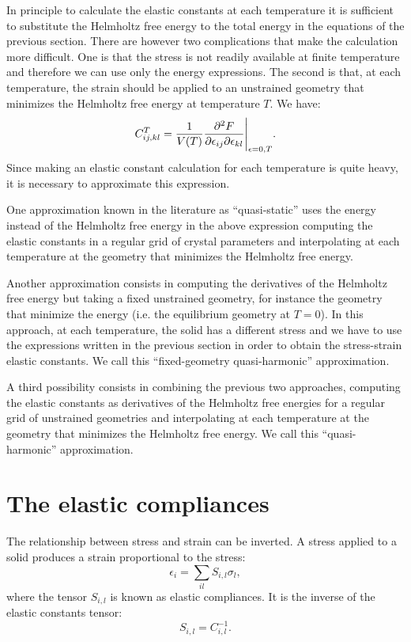 \documentclass[12pt,a4paper,twoside]{report}
\begin{document}
In principle to calculate the elastic constants at each temperature it
is sufficient to substitute the Helmholtz free energy to the total energy
in the equations of the previous section. 
There are however two complications
that make the calculation more difficult. One is that the stress is not
readily available at finite temperature and therefore we can use only the
energy expressions. The second is that, at each temperature, the strain should
be applied to an unstrained geometry that minimizes the Helmholtz free energy 
at temperature $T$. 
We have:
\begin{equation}
C_{ij,kl}^T= {1 \over V(T)}{\partial^2 F \over \partial \epsilon_{ij} 
\partial \epsilon_{kl}}\Bigg|_{\epsilon=0,T}.
\end{equation}
Since making an elastic constant calculation for each temperature is
quite heavy, it is necessary to approximate this expression.

One approximation known in the literature as ``quasi-static'' 
uses the energy instead of the Helmholtz free energy 
in the above expression computing the elastic constants in a regular grid of
crystal parameters and interpolating at each temperature at the geometry
that minimizes the Helmholtz free energy.

Another approximation consists in computing the derivatives of the
Helmholtz free energy but taking a fixed unstrained geometry, for instance 
the geometry that minimize the energy (i.e. the equilibrium geometry 
at $T=0$). In this approach, at each temperature, the solid has a different 
stress and we have to use the expressions written in the previous section 
in order to obtain the stress-strain elastic constants. We call 
this ``fixed-geometry quasi-harmonic'' approximation.

A third possibility consists in combining the previous two approaches,
computing the elastic constants as derivatives of the Helmholtz free
energies for a regular grid of unstrained geometries and interpolating at 
each temperature at the geometry that minimizes the Helmholtz free energy.
We call this ``quasi-harmonic'' approximation.

\newpage
{\color{dark-blue}\chapter{The elastic compliances}}
\color{black}

The relationship between stress and strain can be inverted. A stress 
applied to a solid produces a strain proportional to the stress:
\begin{equation}
\epsilon_{i} =\sum_{il} S_{i,l} \sigma_l, 
\end{equation}
where the tensor $S_{i,l}$ is known as elastic compliances. It is the
inverse of the elastic constants tensor: 
\begin{equation}
S_{i,l} = C_{i,l}^{-1}.
\end{equation}
\end{document}
